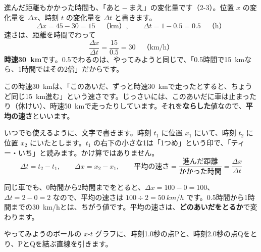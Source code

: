 進んだ距離もかかった時間も、「あと${}-{}$まえ」の変化量です（2-3）。位置 $x$ の変化量を $\Delta x$、時刻 $t$ の変化量を $\Delta t$ と書きます。
\[ \Delta x=45-30=15\quad\text{（km）},\qquad \Delta t=1-0.5=0.5\quad\text{（h）} \]
速さは、距離を時間でわって
\[ \frac{\Delta x}{\Delta t}=\frac{15}{0.5}=30\quad\text{（km/h）} \]
\textbf{時速\qty{30}{km}}です。0.5でわるのは、やってみようと同じで、「0.5時間で\qty{15}{km}なら、1時間ではその2倍」だからです。

この時速\qty{30}{km}は、「このあいだ、ずっと時速\qty{30}{km}で走ったとすると、ちょうど同じ\qty{15}{km}進む」という速さです。じっさいには、このあいだに車は止まったり（休けい）、時速\qty{50}{km}で走ったりしています。それを\textbf{ならした}値なので、\textbf{平均の速さ}といいます。

いつでも使えるように、文字で書きます。時刻 $t_1$ に位置 $x_1$ にいて、時刻 $t_2$ に位置 $x_2$ にいたとします。$t_1$ の右下の小さな1は「1つめ」という印で、「ティー・いち」と読みます。かけ算ではありません。
\[ \Delta t=t_2-t_1,\qquad \Delta x=x_2-x_1,\qquad \text{平均の速さ}=\frac{\text{進んだ距離}}{\text{かかった時間}}=\frac{\Delta x}{\Delta t} \]

同じ車でも、0時間から2時間までをとると、$\Delta x=100-0=100$、$\Delta t=2-0=2$ なので、平均の速さは $100\div2=\qty{50}{km/h}$ です。0.5時間から1時間までの\qty{30}{km/h}とは、ちがう値です。平均の速さは、\textbf{どのあいだをとるか}で変わります。


\label{bk:5-1:katamuki}やってみようのボールの $x$-$t$ グラフに、時刻1.0秒の点Pと、時刻2.0秒の点Qをとり、PとQを結ぶ直線を引きます。

\begin{bkfigure}
\end{bkfigure}

